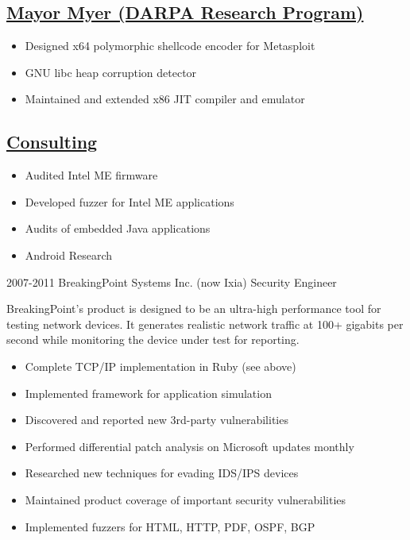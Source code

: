\documentclass[]{friggeri-cv}
\newcommand{\heading}[1]{
  \vskip 0.05in
  \subsection{\uline{\small{#1}}}
  \vskip 0.05in
}
\begin{document}
\begin{entrylist}
{      \heading{Mayor Myer (DARPA Research Program)}
      \begin{itemize}
      \item{Designed x64 polymorphic shellcode encoder for Metasploit}
      \item{GNU libc heap corruption detector}
      \item{Maintained and extended x86 JIT compiler and emulator}
      \end{itemize}
      \heading{Consulting}
      \begin{itemize}
      \item{Audited Intel ME firmware}
      \item{Developed fuzzer for Intel ME applications}
      \item{Audits of embedded Java applications}
      \item{Android Research}
      \end{itemize}
      
    }
  \entry
    {2007-2011}
    {BreakingPoint Systems Inc. (now Ixia)}
    {Security Engineer}
    {

      BreakingPoint's product is designed to be an ultra-high
      performance tool for testing network devices. It generates
      realistic network traffic at 100+ gigabits per second while
      monitoring the device under test for reporting.\\
      
      \begin{itemize}
      \item{Complete TCP/IP implementation in Ruby (see above)}
      \item{Implemented framework for application simulation}
      \item{Discovered and reported new 3rd-party vulnerabilities}
      \item{Performed differential patch analysis on Microsoft updates monthly}
      \item{Researched new techniques for evading IDS/IPS devices}
      \item{Maintained product coverage of important security vulnerabilities} 
      \item{Implemented fuzzers for HTML, HTTP, PDF, OSPF, BGP}
      \end{itemize}

    }
\end{entrylist}
      
\end{document}
